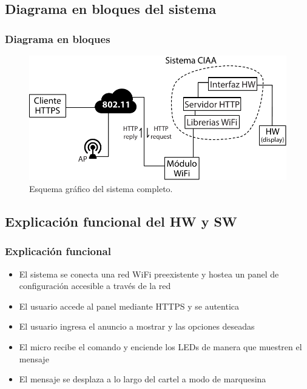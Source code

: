 \subsection{Diagrama en bloques del sistema}
\begin{frame}
	\frametitle{Diagrama en bloques}
	\begin{figure}[htbp]
		\begin{center}
			\includegraphics[width=\textwidth]{diagramas/diagrama-bloques.pdf}
			\caption{Esquema gráfico del sistema completo.}
			\label{fig:diagrama-bloques}
		\end{center}
	\end{figure}
\end{frame}

\subsection{Explicación funcional del HW y SW}
\begin{frame}
	\frametitle{Explicación funcional}
	\begin{itemize}
		 \item El sistema se conecta una red WiFi preexistente y hostea un panel de configuración accesible a través de la red
		 \item El usuario accede al  panel mediante HTTPS y se autentica
		 \item El usuario ingresa el anuncio a mostrar y las opciones deseadas
		 \item El micro recibe el comando y enciende los LEDs de manera que muestren el mensaje
		 \item El mensaje se desplaza a lo largo del cartel a modo de marquesina
	\end{itemize}
	

\end{frame}

